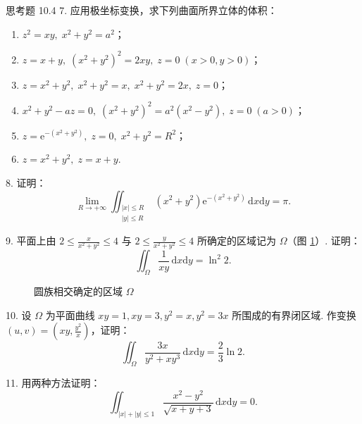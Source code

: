 \begin{exblock}{思考题 10.4}
7. 应用极坐标变换，求下列曲面所界立体的体积：
\begin{enumerate}
  \item $z^2 = xy,\; x^2+y^2 = a^2$；
  \item $z = x+y,\; (x^2+y^2)^2 = 2xy,\; z = 0\; (x > 0, y > 0)$；
  \item $z = x^2+y^2,\; x^2+y^2 = x,\; x^2+y^2 = 2x,\; z = 0$；
  \item $x^2+y^2-az = 0,\; (x^2+y^2)^2 = a^2(x^2-y^2),\; z = 0\; (a > 0)$；
  \item $z = \mathrm{e}^{-(x^2+y^2)},\; z = 0,\; x^2+y^2 = R^2$；
  \item $z = x^2+y^2,\; z = x+y$.
\end{enumerate}

8. 证明：
\[
\lim_{R \to +\infty} \iint_{\substack{|x| \leqslant R \\ |y| \leqslant R}} (x^2+y^2)\mathrm{e}^{-(x^2+y^2)}\,\mathrm{d}x\mathrm{d}y = \pi.
\]

9. 平面上由 $2 \leqslant \frac{x}{x^2+y^2} \leqslant 4$ 与 $2 \leqslant \frac{y}{x^2+y^2} \leqslant 4$ 所确定的区域记为 $\Omega$（图 \ref{fig:10.4.29}）. 证明：
\[
\iint_\Omega \frac{1}{xy}\,\mathrm{d}x\mathrm{d}y = \ln^2 2.
\]

\begin{figure}[htbp]
  \centering
  \caption{圆族相交确定的区域 $\Omega$}\label{fig:10.4.29}
\end{figure}

10. 设 $\Omega$ 为平面曲线 $xy=1, xy=3, y^2=x, y^2=3x$ 所围成的有界闭区域. 作变换 $(u, v) = \left(xy, \frac{y^2}{x}\right)$，证明：
\[
\iint_\Omega \frac{3x}{y^2+xy^3}\,\mathrm{d}x\mathrm{d}y = \frac{2}{3}\ln 2.
\]

11. 用两种方法证明：
\[
\iint_{|x|+|y| \leqslant 1} \frac{x^2-y^2}{\sqrt{x+y+3}}\,\mathrm{d}x\mathrm{d}y = 0.
\]
\end{exblock}
